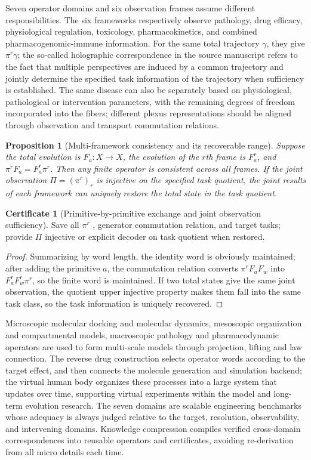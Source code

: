 \documentclass[11pt,a4paper]{article}
\theoremstyle{plain}
\newtheorem{proposition}[theorem]{Proposition}
\theoremstyle{definition}
\newtheorem*{certificate}{Certificate}
\theoremstyle{remark}
\begin{document}
\begin{CJK*}
Seven operator domains and six observation frames assume different responsibilities. The six frameworks respectively observe pathology, drug efficacy, physiological regulation, toxicology, pharmacokinetics, and combined pharmacogenomic-immune information. For the same total trajectory $\gamma$, they give $\pi^r\gamma$; the so-called holographic correspondence in the source manuscript refers to the fact that multiple perspectives are induced by a common trajectory and jointly determine the specified task information of the trajectory when sufficiency is established. The same disease can also be separately based on physiological, pathological or intervention parameters, with the remaining degrees of freedom incorporated into the fibers; different plexus representations should be aligned through observation and transport commutation relations.

\begin{proposition}
[Multi-framework consistency and its recoverable range]\label{fa:prop-multiview}
Suppose the total evolution is $F_a:X\to X$, the evolution of the $r$th frame is $F_a^r$, and $\pi^rF_a=F_a^r\pi^r$. Then any finite operator is consistent across all frames. If the joint observation $\Pi=(\pi^r)_r$ is injective on the specified task quotient, the joint results of each framework can uniquely restore the total state in the task quotient.\end{proposition}
\begin{certificate}
[Primitive-by-primitive exchange and joint observation sufficiency]Save all $\pi^r$ , generator commutation relation, and target tasks; provide $\Pi$ injective or explicit decoder on task quotient when restored.\end{certificate}
\begin{proof}
Summarizing by word length, the identity word is obviously maintained; after adding the primitive $a$, the commutation relation converts $\pi^rF_aF_w$ into $F_a^rF_w^r\pi^r$, so the finite word is maintained. If two total states give the same joint observation, the quotient upper injective property makes them fall into the same task class, so the task information is uniquely recovered.\end{proof}


Microscopic molecular docking and molecular dynamics, mesoscopic organization and compartmental models, macroscopic pathology and pharmacodynamic operators are used to form multi-scale models through projection, lifting and law connection. The reverse drug construction selects operator words according to the target effect, and then connects the molecule generation and simulation backend; the virtual human body organizes these processes into a large system that updates over time, supporting virtual experiments within the model and long-term evolution research. The seven domains are scalable engineering benchmarks whose adequacy is always judged relative to the target, resolution, observability, and intervening domains. Knowledge compression compiles verified cross-domain correspondences into reusable operators and certificates, avoiding re-derivation from all micro details each time. \cite{S03,S13}


\end{CJK*}
\end{document}
